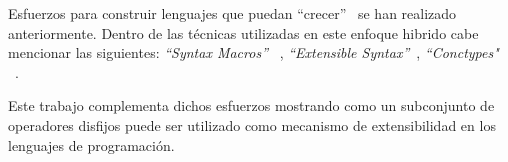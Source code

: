 Esfuerzos para construir lenguajes que puedan ``crecer''~\cite{GuySteele:grow} se han
realizado anteriormente. Dentro de las técnicas utilizadas en este enfoque hibrido
cabe mencionar las siguientes: \textit{``Syntax Macros''} ~\cite{Swierstra:Macros},
\textit{``Extensible Syntax''}~\cite{cardelli:extensiblesyntax},
\textit{``Conctypes"} ~\cite{Aasa:UDS}.

Este trabajo complementa dichos esfuerzos mostrando como un subconjunto de operadores
disfijos puede ser utilizado como mecanismo de extensibilidad en los lenguajes de
programación. 




